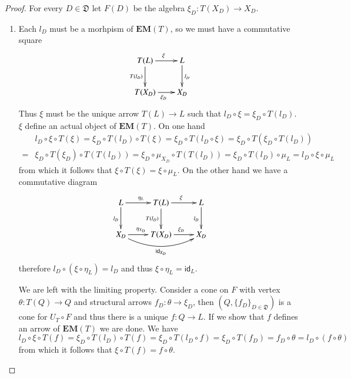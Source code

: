 \documentclass[12pt]{article}
\theoremstyle{definition}
\def\D{\mathfrak D}
\newcommand{\eim}[1]{\mathbf{EM}{(#1)}}
\numberwithin{equation}{section}
\newcommand{\id}[1]{\mathsf{id}_{#1}}
\begin{document}
\begin{proof}
	For every $D\in \D$ let $F(D)$ be the algebra $\xi_D:T(X_D)\rightarrow X_D$.
	\begin{enumerate}[\rm(1)]
		\item Each $l_D$ must be a morhpism of $\eim{T}$, so we must have a commutative square
		\[
		\xymatrix@C=20pt{
			T(L)\ar[r]^{\xi} \ar[d]_{T(l_D)}& L\ar[d]^{l_D}\\
			T(X_D)\ar[r]_{\xi_D} & X_D	
		}
		\]
		Thus $\xi$ must be the unique arrow $T(L)\rightarrow L$ such that $l_D\circ \xi=\xi_D\circ T(l_D)$. $\xi$ define an actual object of $\eim{T}$. On one hand
		\begin{align*}
		&l_D\circ \xi \circ T(\xi)= \xi_D\circ T(l_D)\circ T(\xi)=\xi_D\circ T(l_D\circ \xi)=\xi_D\circ T(\xi_D\circ T(l_D))\\=&\xi_D\circ T(\xi_D)\circ T(T(l_D))=\xi_D \circ \mu_{X_D}\circ T(T(l_D))=\xi_D \circ T(l_D)\circ \mu_{L}=l_D\circ \xi \circ \mu_L
		\end{align*}
		from which it follows that $\xi\circ T(\xi)=\xi \circ \mu_L$. On the other hand we have a commutative diagram
		\[
		\xymatrix{
			L\ar[r]^{\eta_L}\ar[d]_{l_D}&T(L)\ar[r]^{\xi}\ar[d]_{T(l_D)} &L\ar[d]_{l_D}\\
			X_D\ar@/_0.5cm/[rr]_{\id{X_D}}\ar[r]^{\eta_{X_D}} & T(X_D)\ar[r]^{\xi_D} & X_D
		}
		\]
		therefore $l_D\circ (\xi\circ \eta_L)=l_D$ and thus $\xi\circ \eta_L=\id{L}$.
		
		We are left with the limiting property. Consider a cone on $F$ with vertex $\theta:T(Q)\rightarrow Q$ and structural arrows $f_D:\theta \rightarrow \xi_D$, then $(Q, \{f_D\}_{D\in \D})$ is a cone for $U_T\circ F$ and thus there is a unique $f:Q\rightarrow L$. If we show that $f$ defines an arrow of $\eim{T}$ we are done.	We have
		\[l_D\circ \xi\circ T(f) =\xi_D\circ T(l_D)\circ T(f)=\xi_D\circ T(l_D\circ f)=\xi_D\circ T(f_D)=f_D\circ \theta =l_D\circ (f\circ \theta)\]
		from which it follows that $\xi\circ T(f)=f\circ \theta$.
		

\end{enumerate}
\end{proof}
\end{document}
